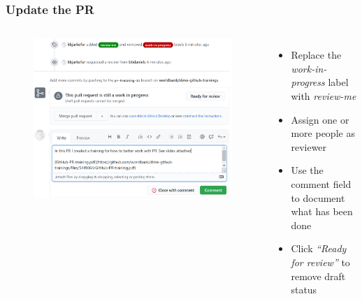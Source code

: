 \documentclass[aspectratio=169]{beamer} %
\begin{document}
\begin{frame}
	\frametitle{Update the PR}
	\begin{columns}[c]

	\vspace{-.75cm}
	\begin{figure}
		\centering
		\includegraphics[width=\textwidth]{./img/undraft-pr.png}
	\end{figure}

	\begin{itemize}
		\setlength\itemsep{1em}
		\item Replace the \textit{work-in-progress} label with \textit{review-me}
		\item Assign one or more people as reviewer
		\item Use the comment field to document what has been done
		\item Click \textit{``Ready for review''} to remove draft status
	\end{itemize}

\end{columns}
\end{frame}
\end{document}
